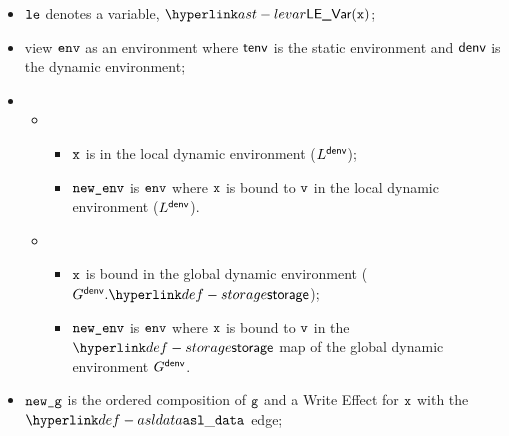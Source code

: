 \ProseParagraph
\AllApply
\begin{itemize}
    \item $\vle$ denotes a variable, $\LEVar(\vx)$;
    \item view $\env$ as an environment where $\tenv$ is the static environment and $\denv$ is the dynamic environment;
    \item \OneApplies
    \begin{itemize}
        \item {}
        \begin{itemize}
            \item $\vx$ is in the local dynamic environment ($L^\denv$);
            \item $\newenv$ is $\env$ where $\vx$ is bound to $\vv$ in the local dynamic environment ($L^\denv$).
        \end{itemize}

        \item {}
        \begin{itemize}
            \item $\vx$ is bound in the global dynamic environment ($G^\denv.\storage$);
            \item $\newenv$ is $\env$ where $\vx$ is bound to $\vv$ in the $\storage$ map of the global dynamic environment $G^\denv$.
        \end{itemize}
    \end{itemize}
    \item $\newg$ is the ordered composition of $\vg$ and a Write Effect for $\vx$ with the $\asldata$ edge;
\end{itemize}

\FormallyParagraph
\begin{mathpar}
\end{mathpar}

\begin{mathpar}
\end{mathpar}

